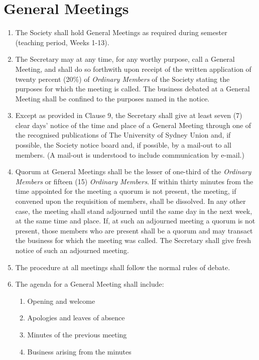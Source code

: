 \documentclass[11pt]{article}
\begin{document}
\section{General Meetings}
\begin{enumerate}[\thesection .1]
    \item The Society shall hold General Meetings as required during semester (teaching period, Weeks 1-13).
    \item The Secretary may at any time, for any worthy purpose, call a General Meeting, and shall do so forthwith upon receipt of the written application of twenty percent (20\%) of \textit{Ordinary Members} of the Society stating the purposes for which the meeting is called. The business debated at a General Meeting shall be confined to the purposes named in the notice.
    \item Except as provided in Clause 9, the Secretary shall give at least seven (7) clear days’ notice of the time and place of a General Meeting through one of the recognised publications of The University of Sydney Union and, if possible, the Society notice board and, if possible, by a mail-out to all members. (A mail-out is understood to include communication by e-mail.)
    \item Quorum at General Meetings shall be the lesser of one-third of the \textit{Ordinary Members} or fifteen (15) \textit{Ordinary Members}. If within thirty minutes from the time appointed for the meeting a quorum is not present, the meeting, if convened upon the requisition of members, shall be dissolved. In any other case, the meeting shall stand adjourned until the same day in the next week, at the same time and place. If, at such an adjourned meeting a quorum is not present, those members who are present shall be a quorum and may transact the business for which the meeting was called. The Secretary shall give fresh notice of such an adjourned meeting.
    \item The procedure at all meetings shall follow the normal rules of debate.
    \item The agenda for a General Meeting shall include:
    \begin{enumerate}[\hspace{5mm}1.]
        \item Opening and welcome
    	\item Apologies and leaves of absence
    	\item Minutes of the previous meeting
    	\item Business arising from the minutes

\end{enumerate}
\end{enumerate}
\end{document}

